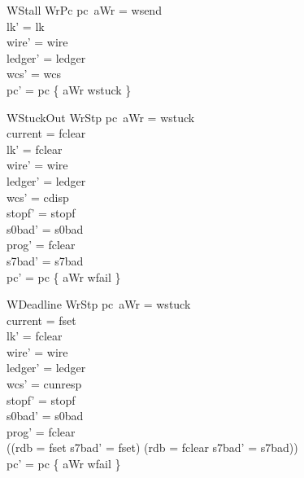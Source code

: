 \documentclass[a4paper,10pt,fleqn]{article}
\begin{document}
\begin{schema}{WStall}
  WrPc
\where
  pc~aWr = wsend \\
  lk' = lk \\
  wire' = wire \\
  ledger' = ledger \\
  wcs' = wcs \\
  pc' = pc \oplus \{ aWr \mapsto wstuck \}
\end{schema}

\begin{schema}{WStuckOut}
  WrStp
\where
  pc~aWr = wstuck \\
  current = fclear \\
  lk' = fclear \\
  wire' = wire \\
  ledger' = ledger \\
  wcs' = cdisp \\
  stopf' = stopf \\
  s0bad' = s0bad \\
  prog' = fclear \\
  s7bad' = s7bad \\
  pc' = pc \oplus \{ aWr \mapsto wfail \}
\end{schema}

\begin{schema}{WDeadline}
  WrStp
\where
  pc~aWr = wstuck \\
  current = fset \\
  lk' = fclear \\
  wire' = wire \\
  ledger' = ledger \\
  wcs' = cunresp \\
  stopf' = stopf \\
  s0bad' = s0bad \\
  prog' = fclear \\
  ((rdb = fset \land s7bad' = fset) \lor (rdb = fclear \land s7bad' = s7bad)) \\
  pc' = pc \oplus \{ aWr \mapsto wfail \}
\end{schema}
\end{document}
